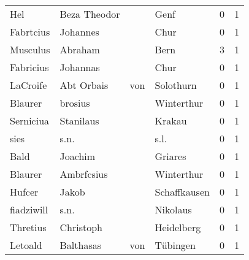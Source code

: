 \documentclass[10pt,a4paper,landscape]{article}
\begin{document}
\begin{longtable}{llllrr}
                      Hel &                       Beza Theodor &             &                                        Genf &          0 &         1 \\
                Fabrtcius &                           Johannes &             &                                        Chur &          0 &         1 \\
                 Musculus &                            Abraham &             &                                        Bern &          3 &         1 \\
                Fabricius &                           Johannas &             &                                        Chur &          0 &         1 \\
                 LaCroife &                        Abt  Orbais &         von &                                   Solothurn &          0 &         1 \\
                  Blaurer &                            brosius &             &                                  Winterthur &          0 &         1 \\
                Serniciua &                          Stanilaus &             &                                      Krakau &          0 &         1 \\
                     sies &                               s.n. &             &                                        s.l. &          0 &         1 \\
                     Bald &                            Joachim &             &                                     Griares &          0 &         1 \\
                  Blaurer &                         Ambrfcsius &             &                                  Winterthur &          0 &         1 \\
                   Hufcer &                              Jakob &             &                                Schaffkausen &          0 &         1 \\
               fiadziwill &                               s.n. &             &                                    Nikolaus &          0 &         1 \\
                 Thretius &                          Christoph &             &                                  Heidelberg &          0 &         1 \\
                  Letoald &                          Balthasas &         von &                                    Tübingen &          0 &         1 \\

\end{longtable}
\end{document}
